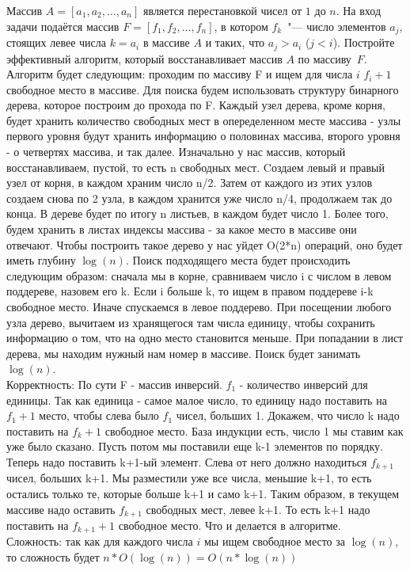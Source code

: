 \documentclass[12pt]{extreport}
\theoremstyle{definiton}
\theoremstyle{definition}
\theoremstyle{definition}
\begin{document}
\Pr[6] Массив $A=[a_1,a_2,\ldots,a_n]$ является перестановкой чисел от $1$ до $n$. На вход задачи подаётся массив $F=[f_1, f_2, \ldots, f_n]$, в котором $f_k$~"--- число элементов $a_j$, стоящих левее числа $k=a_i$ в массиве $A$ и таких, что $a_j > a_i$ ($j<i$). Постройте эффективный алгоритм, который восстанавливает массив $A$ по массиву~$F$.
\newline
\\Алгоритм будет следующим: проходим по массиву F и ищем для числа $i$ $f_i + 1$ свободное место в массиве. Для поиска будем использовать структуру бинарного дерева, которое построим до прохода по F. Каждый узел дерева, кроме корня, будет хранить количество свободных мест в опеределенном месте массива - узлы первого уровня будут хранить информацию о половинах массива, второго уровня - о четвертях массива, и так далее. Изначально у нас массив, который восстанавливаем, пустой, то есть n свободных мест. Cоздаем левый и правый узел от корня, в каждом храним число n/2. Затем от каждого из этих узлов создаем снова по 2 узла, в каждом хранится уже число n/4, продолжаем так до конца. В дереве будет по итогу n листьев, в каждом будет число 1. Более того, будем хранить в листах индексы массива - за какое место в массиве они отвечают. Чтобы построить такое дерево у нас уйдет O(2*n) операций, оно будет иметь глубину $\log(n)$. Поиск подходящего места будет происходить следующим образом: сначала мы в корне, сравниваем число i с числом в левом поддереве, назовем его k. Если i больше k, то ищем в правом поддереве i-k свободное место. Иначе спускаемся в левое поддерево. При посещении любого узла дерево, вычитаем из хранящегося там числа единицу, чтобы сохранить информацию о том, что на одно место становится меньше. При попадании в лист дерева, мы находим нужный нам номер в массиве. Поиск будет занимать $\log(n)$.
\\Корректность: По сути F - массив инверсий. $f_1$ - количество инверсий для единицы. Так как единица - самое малое число, то единицу надо поставить на $f_1 + 1$ место, чтобы слева было $f_1$ чисел, больших 1. Докажем, что число k надо поставить на $f_k + 1$ свободное место. База индукции есть, число 1 мы ставим как уже было сказано. Пусть потом мы поставили еще k-1 элементов по порядку. Теперь надо поставить k+1-ый элемент. Слева от него должно находиться $f_{k+1}$ чисел, больших k+1. Мы разместили уже все числа, меньшие k+1, то есть остались только те, которые больше k+1 и само k+1. Таким образом, в текущем массиве надо оставить $f_{k+1}$ свободных мест, левее k+1. То есть k+1 надо поставить на $f_{k+1} + 1$ свободное место. Что и делается в алгоритме.
\\Сложность: так как для каждого числа $i$ мы ищем свободное место за $\log(n)$, то сложность будет $n*O(\log(n)) = O(n*\log(n))$ 
\end{document}
